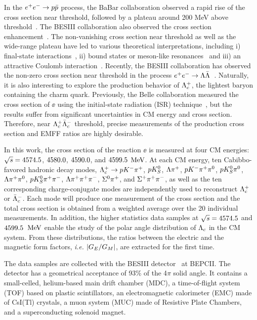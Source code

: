 \documentclass[twocolumn,showpacs,superscriptaddress,amsmath,amssymb]{revtex4-1}
\begin{document}
In the $e^{+}e^{-}\rightarrow p\bar{p}$ process, the BaBar collaboration observed a rapid rise of the cross section near threshold, followed by a plateau around 200 MeV above threshold~\cite{babar2}. The BESIII collaboration also observed the cross section enhancement~\cite{ppbarbes}. The non-vanishing cross section near threshold as well as the wide-range plateau have led to various theoretical interpretations, including i) final-state interactions~\cite{TheoFSInter}, ii) bound states  or meson-like resonances~\cite{TheoRes} and iii) an attractive Coulomb interaction~\cite{Resumfct}. Recently, the BESIII collaboration has observed the non-zero cross section near threshold in the process $e^{+}e^{-}\rightarrow\Lambda\bar{\Lambda}$~\cite{BAM0139}.  Naturally, it is also interesting to explore the production behavior of $\Lambda_{c}^{+}$, the lightest baryon containing the charm quark. Previously, the Belle collaboration measured the cross section of $\ee$ using the initial-state radiation (ISR) technique~\cite{Belle}, but the results suffer from significant uncertainties in CM energy and cross section. Therefore, near $\Lambda_{c}^{+}\bar{\Lambda}_{c}^{-}$ threshold, precise measurements of the production cross section and EMFF ratios are highly desirable.

In this work, the cross section of the reaction $\ee$ is measured at four CM energies: $\sqrt{s}=4574.5$, $4580.0$, $4590.0$, and $4599.5$ $\mathrm{MeV}$. At each CM energy, ten Cabibbo-favored hadronic decay modes, $\Lambda_{c}^{+}\rightarrow pK^{-}\pi^{+}$, $pK_{S}^{0}$, $\Lambda\pi^{+}$, $pK^{-}\pi^{+}\pi^{0}$, $pK_{S}^{0}\pi^{0}$, $\Lambda\pi^{+}\pi^{0}$, $pK_{S}^{0}\pi^{+}\pi^{-}$, $\Lambda\pi^{+}\pi^{+}\pi^{-}$, $\Sigma^{0}\pi^{+}$, and $\Sigma^{+}\pi^{+}\pi^{-}$, as well as the ten corresponding charge-conjugate modes are independently used to reconstruct $\Lambda_{c}^{+}$ or $\bar{\Lambda}_{c}^{-}$. Each mode will produce one measurement of the cross section and the total cross section is obtained from a weighted average over the 20 individual measurements. In addition, the higher statistics data samples at $\sqrt{s}=4574.5$ and $4599.5$~$\mathrm{MeV}$ enable the study of the polar angle distribution of $\Lambda_{c}$ in the CM system. From these distributions, the ratios between the electric and the magnetic form factors, \textit{i.e.} $|G_{E}/G_{M}|$, are extracted for the first time.

The data samples are collected with the BESIII detector~\cite{BESIII} at BEPCII. The detector has a geometrical acceptance of 93\% of the 4$\pi$ solid angle. It contains a small-celled, helium-based main drift chamber (MDC), a time-of-flight system (TOF) based on plastic scintillators, an electromagnetic calorimeter (EMC) made of CsI(Tl) crystals, a muon system (MUC) made of Resistive Plate Chambers, and a superconducting solenoid magnet. 
\end{document}
